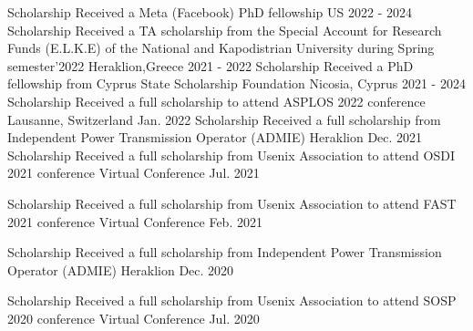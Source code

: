 
\begin{cvhonors}
	\cvhonor
	{Scholarship} %
	{Received a Meta (Facebook) PhD fellowship} %
	{US} %
	{2022 - 2024} %
	\cvhonor
	{Scholarship} %
	{Received a TA scholarship from the Special Account for Research Funds (E.L.K.E) of the National and Kapodistrian University during Spring semester’2022} %
	{Heraklion,Greece} %
	{2021 - 2022} %
	\cvhonor
	{Scholarship} %
	{Received a PhD fellowship from Cyprus State Scholarship Foundation} %
	{Nicosia, Cyprus} %
	{2021 - 2024} %
	\cvhonor
	{Scholarship} %
	{Received a full scholarship to attend ASPLOS 2022 conference} %
	{Lausanne, Switzerland} %
	{Jan. 2022} %
	\cvhonor
	{Scholarship} %
	{Received a full scholarship from Independent Power Transmission
		Operator (ADMIE)} %
	{Heraklion} %
	{Dec. 2021} %
	\cvhonor
	{Scholarship} %
	{Received a full scholarship from Usenix Association to attend
		OSDI 2021 conference} %
	{Virtual Conference} %
	{Jul. 2021} %

	\cvhonor
	{Scholarship} %
	{Received a full scholarship from Usenix Association to attend
		FAST 2021 conference
	} %
	{Virtual Conference} %
	{Feb. 2021} %

	\cvhonor
	{Scholarship} %
	{Received a full scholarship from Independent Power Transmission
		Operator (ADMIE)} %
	{Heraklion} %
	{Dec. 2020} %

	\cvhonor
	{Scholarship} %
	{Received a full scholarship from Usenix Association to attend
		SOSP 2020 conference} %
	{Virtual Conference} %
	{Jul. 2020} %


\end{cvhonors}
